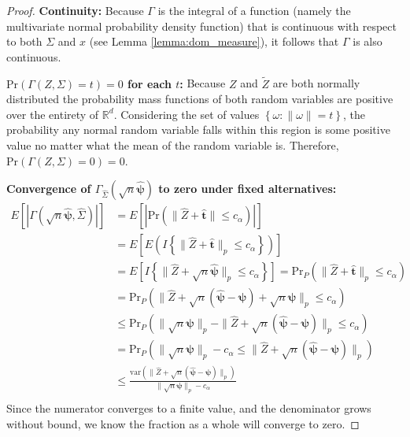 \documentclass{article}
\newcommand{\pr}{\text{Pr}}
\newcommand{\tst}{\hat{\boldsymbol{t}}}
\newcommand{\rvv}{Z}
\newcommand{\gamestp}{\Gamma(\sqrt{n}\hat{\boldsymbol{\psi}}, \hat{\Sigma})}
\newcommand{\gamz}{\Gamma(\rvv, \Sigma)}
\begin{document}
\begin{proof}

\textbf{Continuity:}
Because $\Gamma$ is the integral of a function (namely the multivariate normal probability density function) that is continuous with respect to both $\Sigma$ and $x$ (see Lemma \ref{lemma:dom_measure}), it follows that $\Gamma$ is also continuous. 

\textbf{$\pr\left(\gamz = t\right) = 0$ for each $t$:}
Because $Z$ and $\tilde{Z}$ are both normally distributed the probability mass functions of both random variables are positive over the entirety of $\mathbb{R}^d$.  Considering the set of values $\left\{\omega : \|\omega\| = t\right\}$, the probability any normal random variable falls within this region is some positive value no matter what the mean of the random variable is.  Therefore, $\pr\left(\gamz = 0\right) = 0$. 

\textbf{Convergence of $\Gamma_{\hat{\Sigma}}(\sqrt{n}\hat{\boldsymbol{\psi}})$ to zero under fixed alternatives:}
\begin{align*}
	E[|\gamestp|] &= E\left[ |\text{Pr}(\|\hat{Z} + \tst \|\leq c_\alpha) |\right]\\
	&= E\left[E\left(I\left\{\|\hat{Z} + \tst\|_p \leq c_\alpha\right\} \right)\right]\\
	&= E\left[I\left\{\|\hat{Z} + \sqrt{n}\hat{\boldsymbol{\psi}} \|_p \leq c_\alpha\right\} \right]  = \text{Pr}_{P}\left(\|\hat{Z} + \tst\|_p \leq c_\alpha\right) \\
	& = \text{Pr}_{P}\left(\|\hat{Z} + \sqrt{n}\left(\hat{\boldsymbol{\psi}} - \boldsymbol{\psi}\right) + \sqrt{n} \boldsymbol{\psi}\|_p \leq c_\alpha\right) \\
	& \leq \text{Pr}_{P}\left(\|\sqrt{n} \boldsymbol{\psi}\|_p - \|\hat{Z} + \sqrt{n}\left(\hat{\boldsymbol{\psi}} - \boldsymbol{\psi}\right)\|_p  \leq c_\alpha\right) \\
	& = \text{Pr}_{P}\left(\|\sqrt{n} \boldsymbol{\psi}\|_p -  c_\alpha \leq \|\hat{Z} + \sqrt{n}\left(\hat{\boldsymbol{\psi}} - \boldsymbol{\psi}\right)\|_p\right) \\
	& \leq \frac{\text{var}\left(\|\hat{Z} + \sqrt{n}\left(\hat{\boldsymbol{\psi}} - \boldsymbol{\psi}\right)\|_p \right)}{\|\sqrt{n} \boldsymbol{\psi}\|_p -  c_\alpha}\\
\end{align*}
Since the numerator converges to a finite value, and the denominator grows without bound, we know the fraction as a whole will converge to zero.


\end{proof}
\end{document}
